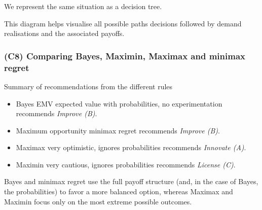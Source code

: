	We represent the same situation as a decision tree.
	
	\begin{center}
	\end{center}
	
	This diagram helps visualise all possible paths decisions followed by demand realisations and the associated payoffs.
	
	\subsubsection{(C8) Comparing Bayes, Maximin, Maximax and minimax regret}\label{example-1-c8}
	
	Summary of recommendations from the different rules
	\begin{itemize}
		\item Bayes EMV expected value with probabilities, no experimentation recommends \emph{Improve (B)}.
		\item Maximum opportunity minimax regret recommends \emph{Improve (B)}.
		\item Maximax very optimistic, ignores probabilities recommends \emph{Innovate (A)}.
		\item Maximin very cautious, ignores probabilities recommends \emph{License (C)}.
	\end{itemize}
	
	Bayes and minimax regret use the full payoff structure (and, in the case of Bayes, the probabilities) to favor a more balanced option,
	whereas Maximax and Maximin focus only on the most extreme possible outcomes.
	
